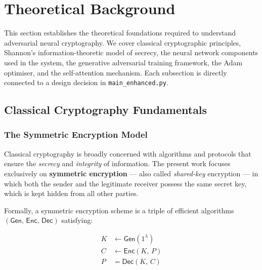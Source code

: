 \documentclass[12pt, a4paper]{article}
\newcommand{\code}[1]{\texttt{\color{CodeRed}#1}}
\begin{document}
\newpage
\section{Theoretical Background}
\label{sec:background}

This section establishes the theoretical foundations required to understand
adversarial neural cryptography. We cover classical cryptographic principles,
Shannon's information-theoretic model of secrecy, the neural network
components used in the system, the generative adversarial training framework,
the Adam optimiser, and the self-attention mechanism. Each subsection is
directly connected to a design decision in \code{main\_enhanced.py}.

\subsection{Classical Cryptography Fundamentals}
\label{subsec:classical}

\subsubsection*{The Symmetric Encryption Model}

Classical cryptography is broadly concerned with algorithms and protocols
that ensure the \emph{secrecy} and \emph{integrity} of information. The
present work focuses exclusively on \textbf{symmetric encryption} — also
called \emph{shared-key} encryption — in which both the sender and the
legitimate receiver possess the same secret key, which is kept hidden from
all other parties.

Formally, a symmetric encryption scheme is a triple of efficient algorithms
$(\mathsf{Gen},\, \mathsf{Enc},\, \mathsf{Dec})$ satisfying:

\begin{align}
  K     &\leftarrow \mathsf{Gen}(1^\lambda)
         \tag{key generation} \\[4pt]
  C     &\leftarrow \mathsf{Enc}(K,\, P)
         \tag{encryption} \\[4pt]
  P     &= \mathsf{Dec}(K,\, C)
         \tag{decryption}
\end{align}
\end{document}
